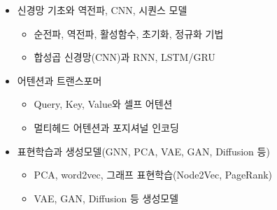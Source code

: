 \documentclass[11pt,a4paper]{article}
\begin{document}
{\begin{minipage}{\dimexpr\textwidth-2\fboxsep-2\fboxrule}
\begin{itemize}[leftmargin=6mm,itemsep=1.2mm,topsep=1mm]
\begin{itemize}[leftmargin=5mm,itemsep=0.3mm,topsep=0.5mm]

\item[--] \small 마진 최대화와 커널 트릭, L1/L2 정규화

\item[--] \small 교차검증과 결정 트리, 랜덤 포레스트, GBDT

\end{itemize}

\item 신경망 기초와 역전파, CNN, 시퀀스 모델

\begin{itemize}[leftmargin=5mm,itemsep=0.3mm,topsep=0.5mm]

\item[--] \small 순전파, 역전파, 활성함수, 초기화, 정규화 기법

\item[--] \small 합성곱 신경망(CNN)과 RNN, LSTM/GRU

\end{itemize}

\item 어텐션과 트랜스포머

\begin{itemize}[leftmargin=5mm,itemsep=0.3mm,topsep=0.5mm]

\item[--] \small Query, Key, Value와 셀프 어텐션

\item[--] \small 멀티헤드 어텐션과 포지셔널 인코딩

\end{itemize}

\item 표현학습과 생성모델(GNN, PCA, VAE, GAN, Diffusion 등)

\begin{itemize}[leftmargin=5mm,itemsep=0.3mm,topsep=0.5mm]

\item[--] \small PCA, word2vec, 그래프 표현학습(Node2Vec, PageRank)

\item[--] \small VAE, GAN, Diffusion 등 생성모델

\end{itemize}

\end{itemize}
\vspace{2mm}
\end{minipage}}
\end{document}
